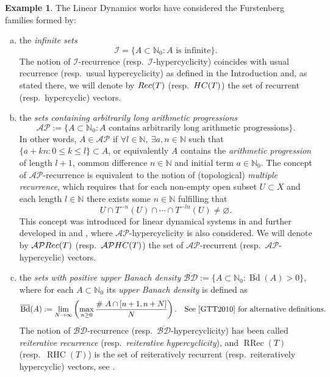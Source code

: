 \documentclass[openright,11pt]{article}
\theoremstyle{plain}
\theoremstyle{definition}
\newtheorem{example}[theorem]{Example}
\newcommand{\NN}{\mathbb{N}}
\newcommand{\AP}{\mathcal{AP}}
\newcommand{\Ic}{\mathcal{I}}
\newcommand{\RRec}{\operatorname{RRec}}
\newcommand{\Rec}{\textup{Rec}}
\newcommand{\RHC}{\operatorname{RHC}}
\newcommand{\HC}{\textup{HC}}
\newcommand{\Bdsup}{\overline{\operatorname{Bd}}}
\newcommand{\BDsup}{\overline{\mathcal{BD}}}
\begin{document}
\begin{example}\label{Exa:F-rec-hyp}
	The Linear Dynamics works \cite{BaMa2009_book,BMPP2016,BMPP2019,BG2018,BoGrLoPe2022,CarMur2022_IEOT,CarMur2022_MS,CarMur2022_arXiv,CoMaPa2014,GriLo2023,GrPe2011_book,Lopez2024_RinM} have considered the Furstenberg families formed by:
	\begin{enumerate}[(a)]
		\item the {\em infinite sets}
		\[
		\Ic = \{ A \subset \NN_0 : A \text{ is infinite} \}.
		\]
		The notion of $\Ic$-recurrence (resp.\ $\Ic$-hypercyclicity) coincides with usual recurrence (resp.\ usual hypercyclicity) as defined in the Introduction and, as stated there, we will denote by $\Rec(T)$ (resp.\ $\HC(T)$) the set of recurrent (resp.\ hypercyclic) vectors.
		
		\item the {\em sets containing arbitrarily long arithmetic progressions}
		\[
		\AP := \{ A \subset \NN_0 : A \text{ contains arbitrarily long arithmetic progressions} \}.
		\]
		In other words, $A \in \AP$ if $\forall l \in \NN, \ \exists a,n \in \NN$ such that $\{a+kn : 0\leq k\leq l\} \subset A$, or equivalently $A$ contains the {\em arithmetic progression} of length $l+1$, common difference $n\in\NN$ and initial term $a\in\NN_0$. The concept of $\AP$-recurrence is equivalent to the notion of (topological) {\em multiple recurrence}, which requires that for each non-empty open subset $U \subset X$ and each length $l \in \NN$ there exists some $n\in\NN$ fulfilling that
		\[
		U \cap T^{-n}(U) \cap \cdots \cap T^{-ln}(U) \neq \varnothing.
		\]
		This concept was introduced for linear dynamical systems in \cite{CoPa2012} and further developed in \cite{KwiLiOpYe2017} and \cite{CarMur2022_MS}, where $\AP$-hypercyclicity is also considered. We will denote by $\AP\Rec(T)$ (resp.\ $\AP\HC(T)$) the set of $\AP$-recurrent (resp.\ $\AP$-hypercyclic) vectors.
		
		\item the {\em sets with positive upper Banach density} $\BDsup := \{ A \subset \NN_0 : \Bdsup(A)>0 \}$, where for each $A \subset \NN_0$ its {\em upper Banach density} is defined as
		\[
		\Bdsup(A) := \lim_{N \to \infty} \left( \max_{n \geq 0} \dfrac{\# \ A\cap [n+1,n+N]}{N} \right). \quad \text{See \cite{GTT2010} for alternative definitions.}
		\]
		The notion of $\BDsup$-recurrence (resp.\ $\BDsup$-hypercyclicity) has been called {\em reiterative recurrence} (resp.\ {\em reiterative hypercyclicity}), and $\RRec(T)$ (resp.\ $\RHC(T)$) is the set of reiteratively recurrent (resp.\ reiteratively hypercyclic) vectors, see \cite{BMPP2016,BMPP2019,BoGrLoPe2022,GriLo2023,Lopez2024_RinM}.
		

\end{enumerate}
\end{example}
\end{document}
